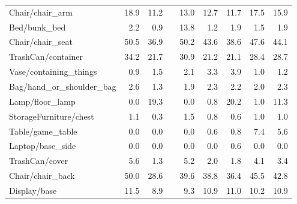 \begin{table}[!h]
\begin{tabular}{lrrrrrrrr}
Chair/chair\_arm          &             18.9 &                 11.2 &&    13.0 &            12.7 &                    11.7 &          17.5 &                  15.9 \\
Bed/bunk\_bed             &              2.2 &                  0.9 &&    13.8 &             1.2 &                     1.9 &           1.5 &                   1.9 \\
Chair/chair\_seat         &             50.5 &                 36.9 &&    50.2 &            43.6 &                    38.6 &          47.6 &                  44.1 \\
TrashCan/container       &             34.2 &                 21.7 &&    30.9 &            21.2 &                    21.1 &          28.4 &                  28.7 \\
Vase/containing\_things   &              0.9 &                  1.5 &&     2.1 &             3.3 &                     3.9 &           1.0 &                   1.2 \\
Bag/hand\_or\_shoulder\_bag &              2.6 &                  1.3 &&     1.9 &             2.3 &                     2.2 &           2.0 &                   2.3 \\
Lamp/floor\_lamp          &              0.0 &                 19.3 &&     0.0 &             0.8 &                    20.2 &           1.0 &                  11.3 \\
StorageFurniture/chest   &              1.1 &                  0.3 &&     1.5 &             0.8 &                     0.6 &           1.0 &                   1.0 \\
Table/game\_table         &              0.0 &                  0.0 &&     0.0 &             0.6 &                     0.8 &           7.4 &                   5.6 \\
Laptop/base\_side         &              0.0 &                  0.0 &&     0.0 &             0.0 &                     0.6 &           0.0 &                   0.0 \\
TrashCan/cover           &              5.6 &                  1.3 &&     5.2 &             2.0 &                     1.8 &           4.1 &                   3.4 \\
Chair/chair\_back         &             50.0 &                 28.6 &&    39.6 &            38.8 &                    36.4 &          45.5 &                  42.8 \\
Display/base             &             11.5 &                  8.9 &&     9.3 &            10.9 &                    11.0 &          10.2 &                  10.9 \\

\end{tabular}
\end{table}
